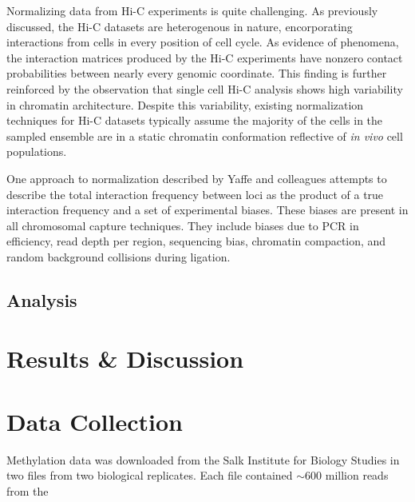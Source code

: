 \documentclass[phd,tocprelim]{cornell}
\begin{document}
Normalizing data from Hi-C experiments is quite challenging.  As previously
discussed, the Hi-C datasets are heterogenous in nature, encorporating
interactions from cells in every position of cell cycle.  As evidence of phenomena,
the interaction matrices produced by the Hi-C experiments have nonzero contact
probabilities between nearly every genomic coordinate\cite{dekker2013}.  This
finding is further reinforced by the observation that single cell Hi-C analysis
shows high variability in chromatin architecture\cite{nagano2013}.  Despite this
variability, existing normalization techniques for Hi-C datasets typically
assume the majority of the cells in the sampled ensemble are in a static
chromatin conformation reflective of \textit{in vivo} cell populations.

One approach to normalization described by Yaffe and colleagues\cite{yaffe2011}
attempts to describe the total interaction frequency between loci as the product
of a true interaction frequency and a set of experimental biases.  These biases
are present in all chromosomal capture techniques.  They include biases due to
PCR in efficiency, read depth per region, sequencing bias, chromatin compaction,
and random background collisions during ligation\cite{benner2014}\cite{dekker2006}.




\section{Analysis}



\chapter{Results \& Discussion}

%
%

\appendix
\appendixpage%
\addappheadtotoc%
\chapter{Data Collection}

Methylation data was downloaded from the Salk Institute for Biology Studies in
two files from two biological replicates.  Each file contained $\sim600$ million
reads from the
\end{document}
